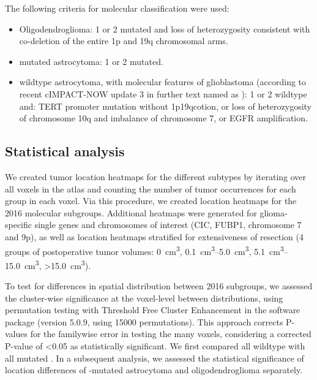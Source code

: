 The following criteria for molecular classification were used:

\begin{itemize}

\item Oligodendroglioma: 1 or 2 mutated and loss of heterozygosity consistent with co-deletion of the entire 1p and 19q chromosomal arms.

\item {} mutated astrocytoma: 1 or 2 mutated.

\item {} wildtype astrocytoma, with molecular features of glioblastoma (according to recent cIMPACT-NOW update 3 \autocite{brat2018}  in further text named as ): 1 or 2 wildtype and: TERT promoter mutation without \acl{1p19qcotion}, or loss of heterozygosity of chromosome 10q and imbalance of chromosome 7, or EGFR amplification.

\end{itemize}

\subsection{Statistical analysis}
We created \gls{tumor} location heatmaps for the different  subtypes by iterating over all voxels in the  atlas and counting the number of \gls{tumor} occurrences for each group in each voxel.
Via this procedure, we created location heatmaps for the  2016 molecular subgroups.
Additional heatmaps were generated for glioma-specific single genes and chromosomes of interest (CIC, FUBP1, chromosome 7 and 9p), as well as location heatmaps stratified for extensiveness of resection (4 groups of postoperative \gls{tumor} volumes: \SI{0}{\cubic\centi\metre}, \SIrange{0.1}{5.0}{\cubic\centi\metre}, \SIrange{5.1}{15.0}{\cubic\centi\metre}, \SI{>15.0}{\cubic\centi\metre}).

To test for differences in spatial distribution between  2016 subgroups, we assessed the cluster-wise significance at the voxel-level between distributions, using permutation testing with Threshold Free Cluster Enhancement in the software package  \autocite{winkler2014permutation} (version 5.0.9, using \num{15000} permutations).
This approach corrects P-values for the familywise error in testing the many voxels, considering a corrected P-value of \num{<0.05} as statistically significant.
We first compared all  wildtype  with all  mutated .
In a subsequent analysis, we assessed the statistical significance of location differences of -mutated astrocytoma and oligodendroglioma separately.


